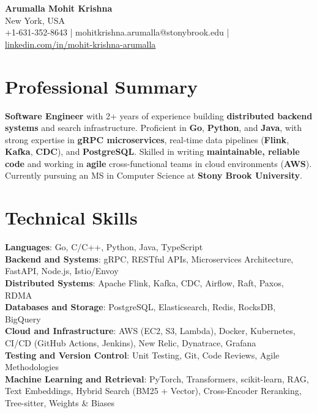 \documentclass[letterpaper,11pt]{article}
\begin{document}
\begin{center}
  {\Large \textbf{Arumalla Mohit Krishna}} \\
  New York, USA \\
  +1-631-352-8643 \enspace | \enspace mohitkrishna.arumalla@stonybrook.edu \enspace | \enspace \href{https://www.linkedin.com/in/mohit-krishna-arumalla}{linkedin.com/in/mohit-krishna-arumalla}
\end{center}

\section{Professional Summary}
  \begin{itemize}[leftmargin=0.15in, label={}]
    \small{\item{
     \textbf{Software Engineer} with 2+ years of experience building \textbf{distributed backend systems} and search infrastructure. Proficient in \textbf{Go}, \textbf{Python}, and \textbf{Java}, with strong expertise in \textbf{gRPC microservices}, real-time data pipelines (\textbf{Flink}, \textbf{Kafka}, \textbf{CDC}), and \textbf{PostgreSQL}. Skilled in writing \textbf{maintainable, reliable code} and working in \textbf{agile} cross-functional teams in cloud environments (\textbf{AWS}). Currently pursuing an MS in Computer Science at \textbf{Stony Brook University}.
    }}
  \end{itemize}
\vspace{-16pt}

\section{Technical Skills}
 \begin{itemize}[leftmargin=0.15in, label={}]
    \small{\item{
     \textbf{Languages}: Go, C/C++, Python, Java, TypeScript \\
     \textbf{Backend and Systems}: gRPC, RESTful APIs, Microservices Architecture, FastAPI, Node.js, Istio/Envoy \\
     \textbf{Distributed Systems}: Apache Flink, Kafka, CDC, Airflow, Raft, Paxos, RDMA \\
     \textbf{Databases and Storage}: PostgreSQL, Elasticsearch, Redis, RocksDB, BigQuery \\
     \textbf{Cloud and Infrastructure}: AWS (EC2, S3, Lambda), Docker, Kubernetes, CI/CD (GitHub Actions, Jenkins), New Relic, Dynatrace, Grafana \\
     \textbf{Testing and Version Control}: Unit Testing, Git, Code Reviews, Agile Methodologies \\
     \textbf{Machine Learning and Retrieval}: PyTorch, Transformers, scikit-learn, RAG, Text Embeddings, Hybrid Search (BM25 + Vector), Cross-Encoder Reranking, Tree-sitter, Weights \& Biases
    }}
 \end{itemize}
\vspace{-16pt}
\end{document}
